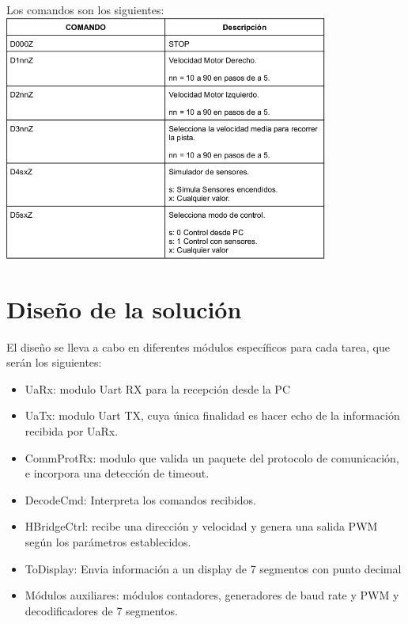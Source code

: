 \documentclass[12pt]{article}
\begin{document}
\newpage


Los comandos son los siguientes:
\\

    \includegraphics[width=0.8\textwidth]{det-protocolo}



\newpage

\section{Diseño de la solución}

El diseño se lleva a cabo en diferentes módulos específicos para cada tarea, que serán los siguientes:
\begin{itemize}
\item UaRx: modulo Uart RX para la recepción desde la PC
\item UaTx: modulo Uart TX, cuya única finalidad es hacer echo de la información recibida por UaRx.
\item CommProtRx: modulo que valida un paquete del protocolo de comunicación, e incorpora una detección de timeout.
\item DecodeCmd: Interpreta los comandos recibidos.
\item HBridgeCtrl: recibe una dirección y velocidad y genera una salida PWM según los parámetros establecidos.
\item ToDisplay: Envia información a un display de 7 segmentos con punto decimal
\item Módulos auxiliares: módulos contadores, generadores de baud rate y PWM y decodificadores de 7 segmentos.
\end{itemize}
\end{document}
